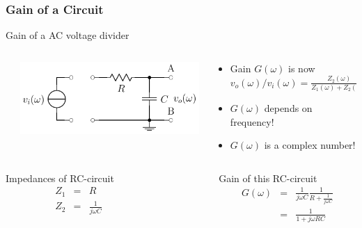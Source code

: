 \documentclass[beamer]{standalone}
\begin{document}
\begin{frame}[t]
 \frametitle{Gain of a Circuit}
 \begin{block}{Gain of a AC voltage divider}
  \begin{columns}
   \begin{column}{0.0\textwidth}
   \end{column}
   \begin{column}{0.5\textwidth}
    \includegraphics[width=\textwidth]{pics/RC_filter}
   \end{column}
   \begin{column}{0.5\textwidth}
    \begin{itemize}
     \item Gain $G(\omega)$ is now $v_o(\omega) / v_i(\omega) = \frac{Z_2(\omega)}{Z_1(\omega) + Z_2(\omega)}$
     \item $G(\omega)$ depends on frequency!
     \item $G(\omega)$ is a complex number!
    \end{itemize}
   \end{column}
  \end{columns}
 \end{block}
 \begin{columns}[t]
  \begin{column}{0.5\textwidth}
   \begin{block}{Impedances of RC-circuit}
    \begin{eqnarray*}
     Z_1 & = & R \\
     Z_2 & = & \frac{1}{j\omega C}
    \end{eqnarray*}
   \end{block}
  \end{column}
  \begin{column}{0.0\textwidth}
  \end{column}
  \begin{column}{0.5\textwidth}
   \begin{block}{Gain of this RC-circuit}
    \begin{eqnarray*}
     G(\omega) & = & \frac{1}{j\omega C} \frac{1}{R +\frac{1}{j\omega C}} \\
               & = & \frac{1}{1 + j\omega R C}
    \end{eqnarray*}
   \end{block}
  \end{column}
 \end{columns}
\end{frame}
\end{document}
